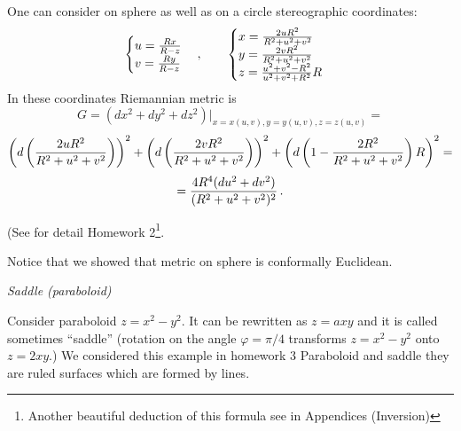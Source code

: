 \documentclass[12pt]{article}
\theoremstyle{theorem}
\numberwithin{equation}{section}
\begin{document}
One can consider on sphere as well as on a circle stereographic coordinates:
                 \begin{equation}
                 \label{stereographiccoordinatesonsphere}
                           \begin{cases}
                    u={Rx\over R-z}
                 \cr
                 v={Ry\over R-z}\cr
                 \end{cases},
                 \qquad \begin{cases}
                 x={2uR^2\over R^2+u^2+v^2}\cr
                 y={2vR^2\over R^2+u^2+v^2}\cr
                 z={u^2+v^2-R^2\over u^2+v^2+R^2}R
                    \end{cases}
                    \end{equation}
In these coordinates Riemannian metric is
                     $$
G=(dx^2+dy^2+dz^2)\big\vert_{x=x(u,v),y=y(u,v),z=z(u,v)}=
                        $$
                        $$
  \left(d\left(2uR^2\over R^2+u^2+v^2\right)\right)^2+
                     \left(d\left(2vR^2\over R^2+u^2+v^2\right)\right)^2+
         \left(d\left(1-{2R^2\over R^2+u^2+v^2}\right)R\right)^2=
                        $$
                       \begin{equation}\label{sphereinstereographiccoordinates}
                        =
         {4R^4(du^2+dv^2)\over (R^2+u^2+v^2)^2}\,.
            \end{equation}



(See for detail Homework 2\footnote
{Another beautiful deduction of this formula
see in Appendices (Inversion)}.



\m

Notice that we showed  that metric on sphere is 
conformally Euclidean.


\centerline {\it Saddle (paraboloid)}

Consider paraboloid $z=x^2-y^2$.
It can be rewritten as $z=axy$ and it is 
called sometimes ``saddle''
(rotation on the angle $\varphi=\pi/4$ 
transforms $z=x^2-y^2$ onto $z=2xy$.)
We considered this example in homework 3
{\footnotesize Paraboloid and saddle they are  ruled surfaces which are formed by lines.}
\end{document}
